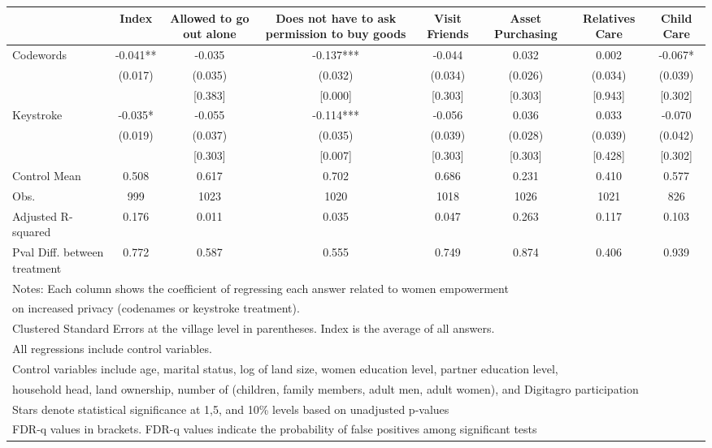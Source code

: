 {
\def\sym#1{\ifmmode^{#1}\else\(^{#1}\)\fi}
\begin{tabular}{l*{7}{c}}
\toprule
                &\multicolumn{1}{c}{Index}&\multicolumn{1}{c}{Allowed to go out alone}&\multicolumn{1}{c}{Does not have to ask permission to buy goods}&\multicolumn{1}{c}{Visit Friends}&\multicolumn{1}{c}{Asset Purchasing}&\multicolumn{1}{c}{Relatives Care}&\multicolumn{1}{c}{Child Care}\\
\midrule
Codewords       &   -0.041** &   -0.035   &   -0.137***&   -0.044   &    0.032   &    0.002   &   -0.067*  \\
                &  (0.017)   &  (0.035)   &  (0.032)   &  (0.034)   &  (0.026)   &  (0.034)   &  (0.039)   \\
                &            &  [0.383]   &  [0.000]   &  [0.303]   &  [0.303]   &  [0.943]   &  [0.302]   \\
Keystroke       &   -0.035*  &   -0.055   &   -0.114***&   -0.056   &    0.036   &    0.033   &   -0.070   \\
                &  (0.019)   &  (0.037)   &  (0.035)   &  (0.039)   &  (0.028)   &  (0.039)   &  (0.042)   \\
                &            &  [0.303]   &  [0.007]   &  [0.303]   &  [0.303]   &  [0.428]   &  [0.302]   \\
\midrule
Control Mean    &    0.508   &    0.617   &    0.702   &    0.686   &    0.231   &    0.410   &    0.577   \\
Obs.            &      999   &     1023   &     1020   &     1018   &     1026   &     1021   &      826   \\
Adjusted R-squared&    0.176   &    0.011   &    0.035   &    0.047   &    0.263   &    0.117   &    0.103   \\
Pval Diff. between treatment&    0.772   &    0.587   &    0.555   &    0.749   &    0.874   &    0.406   &    0.939   \\
\bottomrule
\multicolumn{8}{l}{\footnotesize Notes: Each column shows the coefficient of regressing each answer related to women empowerment}\\
\multicolumn{8}{l}{\footnotesize on increased privacy (codenames or keystroke treatment).}\\
\multicolumn{8}{l}{\footnotesize Clustered Standard Errors at the village level in parentheses. Index is the average of all answers.}\\
\multicolumn{8}{l}{\footnotesize All regressions include control variables.}\\
\multicolumn{8}{l}{\footnotesize Control variables include age, marital status, log of land size, women education level, partner education level,}\\
\multicolumn{8}{l}{\footnotesize household head, land ownership, number of (children, family members, adult men, adult women), and Digitagro participation}\\
\multicolumn{8}{l}{\footnotesize Stars denote statistical significance at 1,5, and 10\% levels based on unadjusted p-values}\\
\multicolumn{8}{l}{\footnotesize FDR-q values in brackets. FDR-q values indicate the probability of false positives among significant tests}\\
\end{tabular}
}
